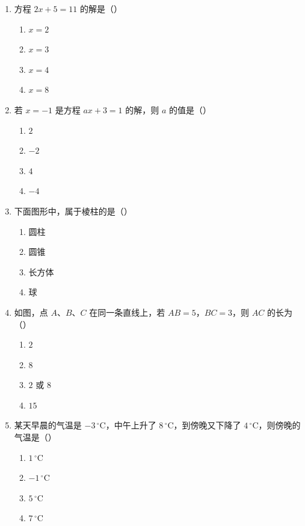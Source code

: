 \documentclass[12pt, a4paper]{ctexart}
\newcommand{\blank}[1]{\underline{\hspace{#1}}}
\begin{document}
\begin{enumerate}[label=\textbf{\arabic*.}, leftmargin=2.5em]
\vspace{6pt}

\item 方程 $2x + 5 = 11$ 的解是（\blank{1cm}）
\begin{enumerate}[label=\Alph*., nosep]
\item $x = 2$
\item $x = 3$
\item $x = 4$
\item $x = 8$
\end{enumerate}

\vspace{6pt}

\item 若 $x = -1$ 是方程 $ax + 3 = 1$ 的解，则 $a$ 的值是（\blank{1cm}）
\begin{enumerate}[label=\Alph*., nosep]
\item $2$
\item $-2$
\item $4$
\item $-4$
\end{enumerate}

\vspace{6pt}

\item 下面图形中，属于棱柱的是（\blank{1cm}）
\begin{enumerate}[label=\Alph*., nosep]
\item 圆柱
\item 圆锥
\item 长方体
\item 球
\end{enumerate}

\vspace{6pt}

\item 如图，点 $A$、$B$、$C$ 在同一条直线上，若 $AB = 5$，$BC = 3$，则 $AC$ 的长为（\blank{1cm}）
\begin{enumerate}[label=\Alph*., nosep]
\item $2$
\item $8$
\item $2$ 或 $8$
\item $15$
\end{enumerate}

\vspace{6pt}

\item 某天早晨的气温是 $-3\,^{\circ}\mathrm{C}$，中午上升了 $8\,^{\circ}\mathrm{C}$，到傍晚又下降了 $4\,^{\circ}\mathrm{C}$，则傍晚的气温是（\blank{1cm}）
\begin{enumerate}[label=\Alph*., nosep]
\item $1\,^{\circ}\mathrm{C}$
\item $-1\,^{\circ}\mathrm{C}$
\item $5\,^{\circ}\mathrm{C}$
\item $7\,^{\circ}\mathrm{C}$
\end{enumerate}

\end{enumerate}
\end{document}
